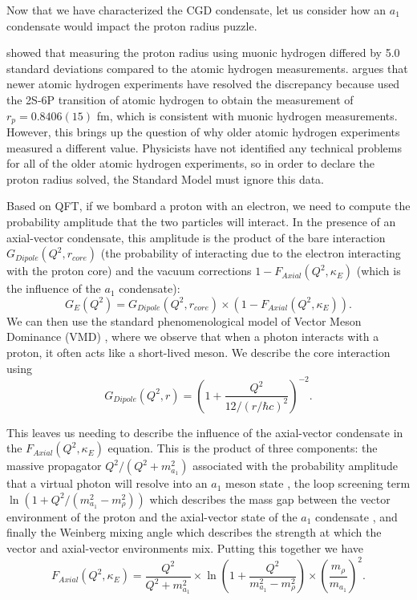 Now that we have characterized the CGD condensate, let us consider how an $a_1$ condensate would impact the proton radius puzzle.

\citet{pohl2010size} showed that measuring the proton radius using muonic hydrogen differed by 5.0 standard deviations compared to the atomic hydrogen measurements. \citet{miller2026proton} argues that newer atomic hydrogen experiments have resolved the discrepancy because \citet{maisenbacher2026sub} used the 2S-6P transition of atomic hydrogen to obtain the measurement of $r_p = 0.8406(15)$ fm, which is consistent with muonic hydrogen measurements. However, this brings up the question of why older atomic hydrogen experiments measured a different value. Physicists have not identified any technical problems for all of the older atomic hydrogen experiments, so in order to declare the proton radius solved, the Standard Model must ignore this data.

Based on QFT, if we bombard a proton with an electron, we need to compute the probability amplitude that the two particles will interact. In the presence of an axial-vector condensate, this amplitude is the product of the bare interaction $G_{Dipole}(Q^2, r_{core})$ (the probability of interacting due to the electron interacting with the proton core) and the vacuum corrections $1 - F_{Axial}(Q^2, \kappa_E)$ (which is the influence of the $a_1$ condensate):
\begin{equation}
    G_E(Q^2) = G_{Dipole}(Q^2, r_{core}) \times ( 1 - F_{Axial}(Q^2, \kappa_E) ).
\end{equation}
\noindent We can then use the standard phenomenological model of Vector Meson Dominance (VMD) \citep{bodek2008vector}, where we observe that when a photon interacts with a proton, it often acts like a short-lived meson. We describe the core interaction using
\begin{equation}
    G_{Dipole}(Q^2, r) = \left( 1 + \frac{Q^2}{12 / (r / \hbar c)^2} \right)^{-2}.
\end{equation}

This leaves us needing to describe the influence of the axial-vector condensate in the $F_{Axial}(Q^2, \kappa_E)$ equation. This is the product of three components: the massive propagator $Q^2 / (Q^2 + m_{a_1}^2)$ associated with the probability amplitude that a virtual photon will resolve into an $a_1$ meson state \citep{guichon1983axial}, the loop screening term $\ln(1 + Q^2 / (m_{a_1}^2 - m_\rho^2))$ which describes the mass gap between the vector environment of the proton and the axial-vector state of the $a_1$ condensate \citep{coleman1973radiative, gross1973asymptotically}, and finally the Weinberg mixing angle \citep{weinberg1967precise} which describes the strength at which the vector and axial-vector environments mix. Putting this together we have
\begin{equation}
    F_{Axial}(Q^2, \kappa_E) = \frac{Q^2}{Q^2 + m_{a_1}^2} \times \ln\left( 1 + \frac{Q^2}{m_{a_1}^2 - m_\rho^2} \right) \times \left( \frac{m_\rho}{m_{a_1}} \right)^2 .
\end{equation}

